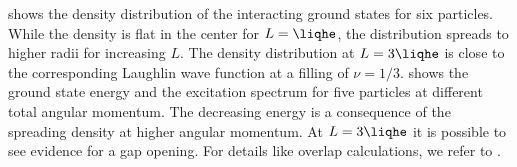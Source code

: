  shows the density distribution of the interacting ground states for six particles. While the density is flat in the center for $L=\liqhe$, the distribution spreads to higher radii for increasing $L$. The density distribution at $L=3\liqhe$ is close to the corresponding Laughlin wave function at a filling of $\nu=1/3$.  shows the ground state energy and the excitation spectrum for five particles at different total angular momentum. The decreasing energy is a consequence of the spreading density at higher angular momentum. At $L=3\liqhe$ it is possible to see evidence for a gap opening. For details like overlap calculations, we refer to .
